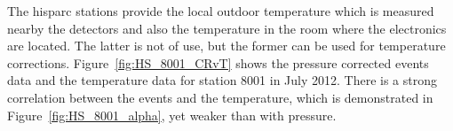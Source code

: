 %
%
%
%
%
%
%

The \gls{hisparc} stations provide the local outdoor temperature which is measured nearby the detectors and also the temperature in the room where the electronics are located. The latter is not of use, but the former can be used for temperature corrections. Figure~\ref{fig:HS_8001_CRvT} shows the pressure corrected events data and the temperature data for station 8001 in July 2012. There is a strong correlation between the events and the temperature, which is demonstrated in Figure~\ref{fig:HS_8001_alpha}, yet weaker than with pressure.

